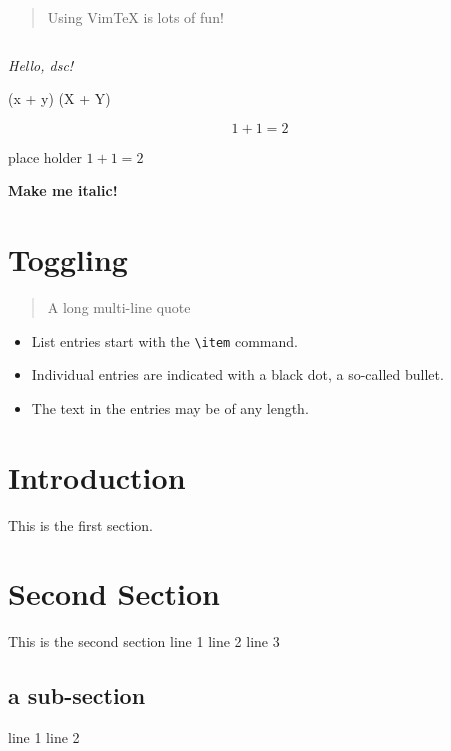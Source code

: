 
\begin{quote}
Using VimTeX is lots of fun!
\end{quote}

\begin{equation*}
\end{equation*}

\textit{Hello, dsc!}

(x + y)
\left(X + Y\right)


\begin{equation}
	1 + 1 = 2
\end{equation}

place holder 
$1 + 1 = 2$

\textbf{Make me italic!}

\section{Toggling}

\begin{quote}
	A
	long
	multi-line
	quote
\end{quote}

\begin{itemize}
	\item List entries start with the \verb|\item| command.
	\item Individual entries are indicated with a black dot, a so-called bullet.
	\item The text in the entries may be of any length.
\end{itemize}

\section{Introduction}

This is the first section.

\blindtext

\section{Second Section}
This is the second section
line 1
line 2
line 3

\subsection{a sub-section}
line 1
line 2 
	